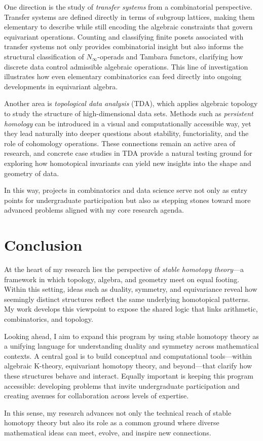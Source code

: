\documentclass[11pt]{article}
\begin{document}
One direction is the study of {\it transfer systems} from a combinatorial perspective.
Transfer systems are defined directly in terms of subgroup lattices, making them elementary to describe while still encoding the algebraic constraints that govern equivariant operations.
Counting and classifying finite posets associated with transfer systems not only provides combinatorial insight but also informs the structural classification of $N_\infty$-operads and Tambara functors, clarifying how discrete data control admissible algebraic operations.
This line of investigation illustrates how even elementary combinatorics can feed directly into ongoing developments in equivariant algebra.

Another area is {\it topological data analysis} (TDA), which applies algebraic topology to study the structure of high-dimensional data sets.
Methods such as {\it persistent homology} can be introduced in a visual and computationally accessible way, yet they lead naturally into deeper questions about stability, functoriality, and the role of cohomology operations.
These connections remain an active area of research, and concrete case studies in TDA provide a natural testing ground for exploring how homotopical invariants can yield new insights into the shape and geometry of data.

In this way, projects in combinatorics and data science serve not only as entry points for undergraduate participation but also as stepping stones toward more advanced problems aligned with my core research agenda.

\section{Conclusion}
At the heart of my research lies the perspective of {\it stable homotopy theory}—a framework in which topology, algebra, and geometry meet on equal footing.
Within this setting, ideas such as duality, symmetry, and equivariance reveal how seemingly distinct structures reflect the same underlying homotopical patterns.
My work develops this viewpoint to expose the shared logic that links arithmetic, combinatorics, and topology.

Looking ahead, I aim to expand this program by using stable homotopy theory as a unifying language for understanding duality and symmetry across mathematical contexts.
A central goal is to build conceptual and computational tools—within algebraic K-theory, equivariant homotopy theory, and beyond—that clarify how these structures behave and interact.
Equally important is keeping this program accessible: developing problems that invite undergraduate participation and creating avenues for collaboration across levels of expertise.

In this sense, my research advances not only the technical reach of stable homotopy theory but also its role as a common ground where diverse mathematical ideas can meet, evolve, and inspire new connections.



\end{document}
